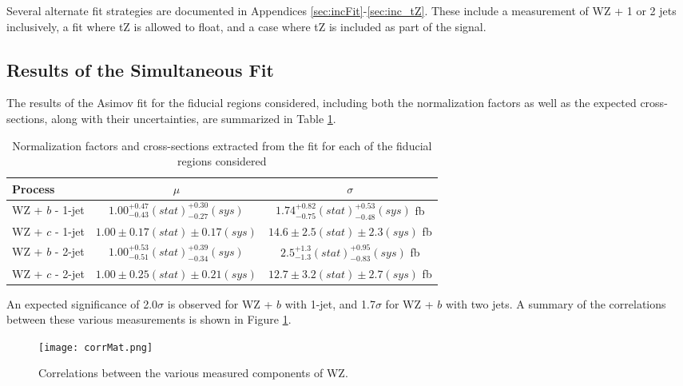 Several alternate fit strategies are documented in Appendices \ref{sec:incFit}-\ref{sec:inc_tZ}. These include a measurement of WZ + 1 or 2 jets inclusively, a fit where tZ is allowed to float, and a case where tZ is included as part of the signal.

\subsection{Results of the Simultaneous Fit}
\label{sec:resSum}

The results of the Asimov fit for the fiducial regions considered, including both the normalization factors as well as the expected cross-sections, along with their uncertainties, are summarized in Table \ref{tab:WZ_results}.

\hspace{-1in}\begin{table}[H]
\begin{adjustwidth}{-3em}{-3em}
\begin{center}
\begin{tabular}{|l|c|c|}
\hline
Process & $\mu$ & $\sigma$ \\
\hline
WZ + $b$ - 1-jet & $1.00^{+0.47}_{-0.43}(stat)^{+0.30}_{-0.27}(sys)$ & $1.74^{+0.82}_{-0.75}(stat)^{+0.53}_{-0.48}(sys)$ fb \\
WZ + $c$ - 1-jet & $1.00 \pm 0.17(stat) \pm 0.17(sys)$ & $14.6 \pm 2.5 (stat) \pm 2.3 (sys)$ fb \\
WZ + $b$ - 2-jet & $1.00^{+0.53}_{-0.51}(stat)^{+0.39}_{-0.34}(sys)$ & $2.5^{+1.3}_{-1.3}(stat)^{+0.95}_{-0.83}(sys)$ fb \\
WZ + $c$ - 2-jet & $1.00 \pm 0.25(stat) \pm 0.21(sys)$ & $12.7 \pm 3.2 (stat) \pm 2.7 (sys)$ fb \\
\hline
\end{tabular}
\caption{Normalization factors and cross-sections extracted from the fit for each of the fiducial regions considered}
\label{tab:WZ_results}
\end{center}
\end{adjustwidth}
\end{table}

An expected significance of 2.0$\sigma$ is observed for WZ + $b$ with 1-jet, and 1.7$\sigma$ for WZ + $b$ with two jets. A summary of the correlations between these various measurements is shown in Figure \ref{fig:corrMat}.

\begin{figure}[H]
  \center
  \texttt{[image: corrMat.png]}
  \caption{Correlations between the various measured components of WZ.}
  \label{fig:corrMat}
\end{figure}

